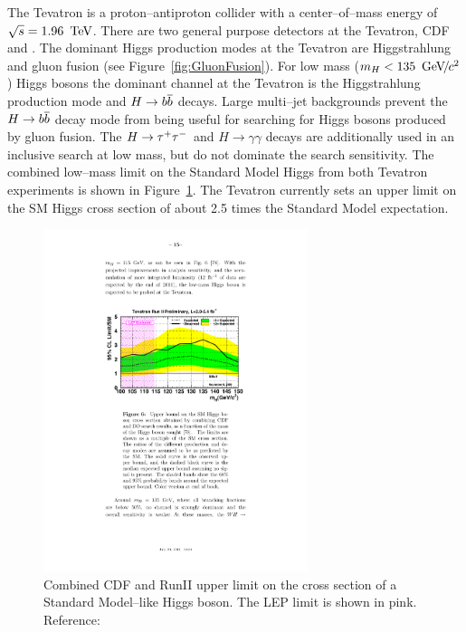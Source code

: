 The Tevatron is a proton--antiproton collider with a center--of--mass energy of
\mbox{$\sqrt s = 1.96~\,\text{Te\hspace{-.08em}V}$}.  There are two general purpose detectors at the Tevatron,
CDF and \DZERO\@. The dominant Higgs production modes at the Tevatron are
Higgstrahlung and gluon fusion (see Figure~\ref{fig:GluonFusion}).  For low mass
\mbox{($m_H < 135~{\,\text{Ge\hspace{-.08em}V\hspace{-0.16em}/\hspace{-0.08em}}c^\text{2}}$)} Higgs bosons the dominant channel at the Tevatron is
the Higgstrahlung production mode and \mbox{$H\to{b\overline{b}}$} decays.  Large
multi--jet backgrounds prevent the \mbox{$H\to{b\overline{b}}$} decay mode from being
useful for searching for Higgs bosons produced by gluon fusion.  The $H\to\tau^+\tau^-$
and $H \to \gamma \gamma$ decays are additionally used in an inclusive search at
low mass, but do not dominate the search sensitivity.  The combined low--mass
limit on the Standard Model Higgs from both Tevatron experiments is shown in
Figure~\ref{fig:TevatronLowMassHiggsLimit}.  The Tevatron currently sets an
upper limit on the SM Higgs cross section of about 2.5 times the Standard Model
expectation.
\begin{figure}
  \centering
  \includegraphics[height=100mm,angle=00]{theory_chapter/figures/tevatron_low_mass_sm_higgs_limit.pdf}
  \caption[Tevatron low mass Standard Model Higgs limit plot]{Combined CDF and
  \DZERO RunII upper limit on the cross section of a Standard Model--like Higgs
  boson.  The LEP limit is shown in pink. Reference:~\cite{PDG}}
  \label{fig:TevatronLowMassHiggsLimit}
\end{figure}

